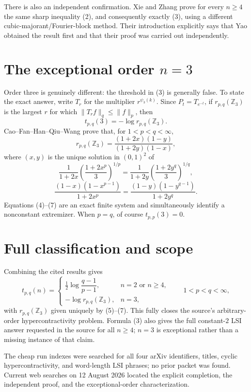 \documentclass[11pt]{article}
\newcommand{\Z}{\mathbb Z}
\begin{document}
There is also an independent confirmation.  Xie and Zhang
\cite[Theorem 1 and Corollary 2]{XZ} prove for every \(n\ge4\) the same sharp
inequality (2), and consequently exactly (3), using a different
cubic-majorant/Fourier-block method.  Their introduction explicitly says
that Yao obtained the result first and that their proof was carried out
independently.

\section*{The exceptional order \(n=3\)}

Order three is genuinely different: the threshold in (3) is generally
false.  To state the exact answer, write \(T_r\) for the multiplier
\(r^{\psi_3(k)}\).  Since \(P_t=T_{e^{-t}}\), if \(r_{p,q}(\Z_3)\) is the
largest \(r\) for which \(\|T_rf\|_q\le\|f\|_p\), then
\[
 t_{p,q}(3)=-\log r_{p,q}(\Z_3).                         \tag{4}
\]
Cao--Fan--Han--Qiu--Wang \cite[Theorem 1.2]{CFHQW} prove that, for
\(1<p<q<\infty\),
\[
 \boxed{r_{p,q}(\Z_3)=\frac{(1+2x)(1-y)}{(1+2y)(1-x)},} \tag{5}
\]
where \((x,y)\) is the unique solution in \((0,1)^2\) of
\[
 \frac1{1+2x}\left(\frac{1+2x^p}{3}\right)^{1/p}
 =\frac1{1+2y}\left(\frac{1+2y^q}{3}\right)^{1/q},      \tag{6}
\]
\[
 \frac{(1-x)(1-x^{p-1})}{1+2x^p}
 =\frac{(1-y)(1-y^{q-1})}{1+2y^q}.                      \tag{7}
\]
Equations (4)--(7) are an exact finite system and simultaneously identify a
nonconstant extremizer.  When \(p=q\), of course \(t_{p,p}(3)=0\).

\section*{Full classification and scope}

Combining the cited results gives
\[
 \boxed{
 t_{p,q}(n)=
 \begin{cases}
 \frac12\log\dfrac{q-1}{p-1},&n=2\text{ or }n\ge4,\\[6pt]
 -\log r_{p,q}(\Z_3),&n=3,
 \end{cases}}
 \qquad 1<p<q<\infty,                                  \tag{8}
\]
with \(r_{p,q}(\Z_3)\) given uniquely by (5)--(7).  This fully closes the
source's arbitrary-order hypercontractivity problem.  Formula (3) also gives
the full constant-\(2\) LSI answer requested in the source for all \(n\ge4\);
\(n=3\) is exceptional rather than a missing instance of that claim.

The cheap run indexes were searched for all four arXiv identifiers, titles,
cyclic hypercontractivity, and word-length LSI phrases; no prior packet was
found.  Current web searches on 12 August 2026 located the explicit completion,
the independent proof, and the exceptional-order characterization.
\end{document}
